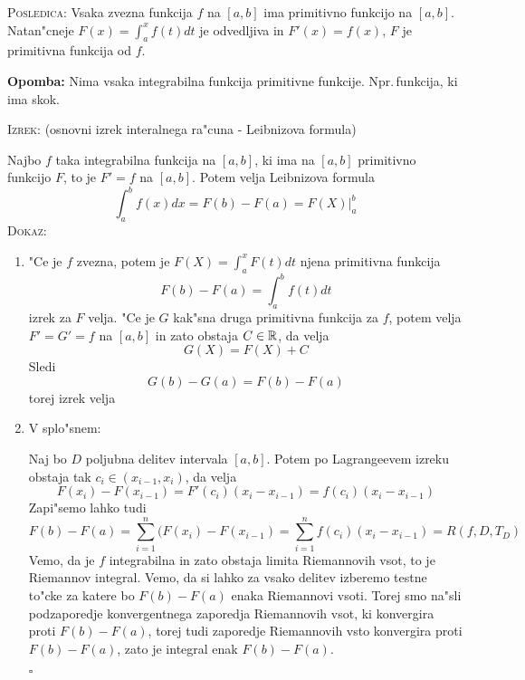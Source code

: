 \textsc{Posledica:} Vsaka zvezna funkcija $f$ na $[a, b]$ ima primitivno funkcijo na $[a, b]$. Natan"cneje $F(x) = \int_{a}^{x} f(t)dt$ je odvedljiva in $F'(x) = f(x)$, $F$ je primitivna funkcija od $f$.

\textbf{Opomba:} Nima vsaka integrabilna funkcija primitivne funkcije. Npr.\,funkcija, ki ima skok.

\textsc{Izrek:} (osnovni izrek interalnega ra"cuna - Leibnizova formula)

Najbo $f$ taka integrabilna funkcija na $[a, b]$, ki ima na $[a, b]$ primitivno funkcijo $F$, to je $F' = f$ na $[a, b]$. Potem velja Leibnizova formula
\begin{equation*}
\int_{a}^{b} f(x) dx = F(b) - F(a) = F(X) \rvert_a^b
\end{equation*}
\textsc{Dokaz:}
\begin{enumerate}
	\item "Ce je $f$ zvezna, potem je $F(X) = \int_{a}^{x}F(t)dt$ njena primitivna funkcija
	\begin{equation*}
	F(b) - F(a) = \int_a^b f(t) dt
	\end{equation*}
	izrek za $F$ velja. "Ce je $G$ kak"sna druga primitivna funkcija za $f$, potem velja $F' = G' = f$ na $[a, b]$ in zato obstaja $C \in \mathbb{R}$, da velja
	\begin{equation*}
	G(X) = F(X) + C
	\end{equation*}
	Sledi
	\begin{equation*}
	G(b) - G(a) = F(b) - F(a)
	\end{equation*}
	torej izrek velja
	
	\item V splo"snem:
	
	Naj bo $D$ poljubna delitev intervala $[a, b]$. Potem po Lagrangeevem izreku obstaja tak $c_i \in (x_{i-1}, x_i)$, da velja
	\begin{equation*}
	F(x_i) - F(x_{i-1}) = F'(c_i) (x_i - x_{i-1}) = f(c_i) (x_i - x_{i-1})
	\end{equation*}
	Zapi"semo lahko tudi
	\begin{equation*}
	F(b) - F(a) = \sum_{i=1}^{n} (F(x_i) - F(x_{i-1}) = \sum_{i=1}^{n} f(c_i) (x_i - x_{i-1}) = R(f, D, T_D)
	\end{equation*}
	Vemo, da je $f$ integrabilna in zato obstaja limita Riemannovih vsot, to je Riemannov integral. Vemo, da si lahko za vsako delitev izberemo testne to"cke za katere bo $F(b) - F(a)$ enaka Riemannovi vsoti. Torej smo na"sli podzaporedje konvergentnega zaporedja Riemannovih vsot, ki konvergira proti $F(b) - F(a)$, torej tudi zaporedje Riemannovih vsto konvergira proti $F(b) - F(a)$, zato je integral enak $F(b) - F(a)$.
	
	\hfill $\square$
\end{enumerate}

